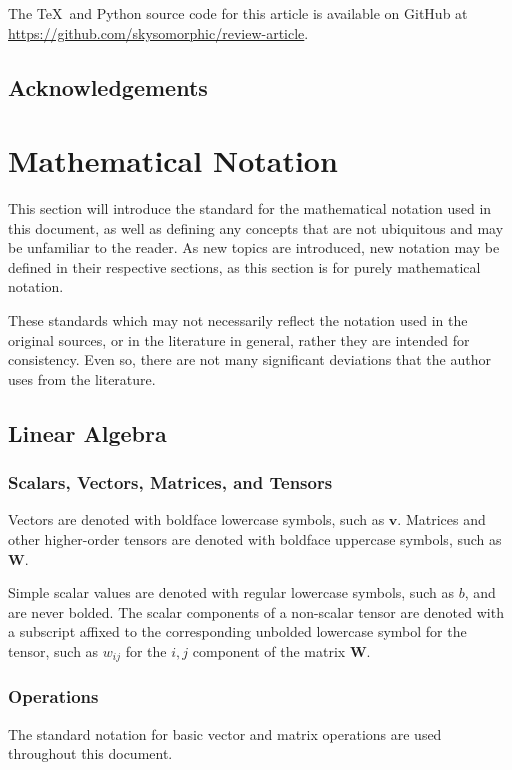 \documentclass[12pt]{report}
\theoremstyle{definition}
\theoremstyle{remark}
\begin{document}
The \TeX~and Python source code for this article is available on GitHub at \url{https://github.com/skysomorphic/review-article}.

\subsection{Acknowledgements}

\section{Mathematical Notation}\label{notation}
This section will introduce the standard for the mathematical notation used in this document, as well as defining any concepts that are not ubiquitous and may be unfamiliar to the reader. As new topics are introduced, new notation may be defined in their respective sections, as this section is for purely mathematical notation.

These standards which may not necessarily reflect the notation used in the original sources, or in the literature in general, rather they are intended for consistency. Even so, there are not many significant deviations that the author uses from the literature.

\subsection{Linear Algebra}
\subsubsection{Scalars, Vectors, Matrices, and Tensors}
Vectors are denoted with boldface lowercase symbols, such as $\mathbf{v}$. Matrices and other higher-order tensors are denoted with boldface uppercase symbols, such as $\mathbf{W}$.

Simple scalar values are denoted with regular lowercase symbols, such as $b$, and are never bolded. The scalar components of a non-scalar tensor are denoted with a subscript affixed to the corresponding unbolded lowercase symbol for the tensor, such as $w_{ij}$ for the $i,j$ component of the matrix $\mathbf{W}$.

\subsubsection{Operations} %
The standard notation for basic vector and matrix operations are used throughout this document.
\end{document}
